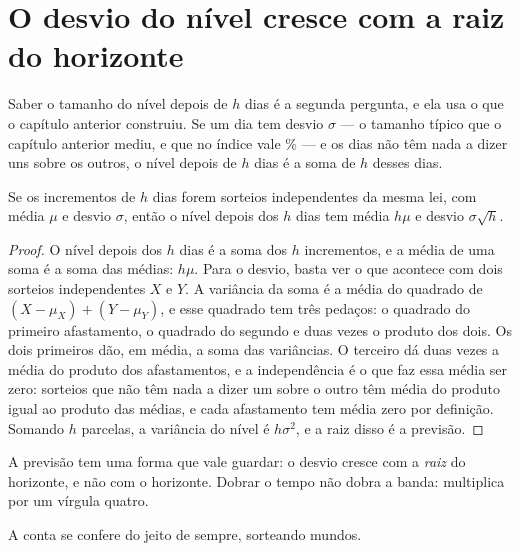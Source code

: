 \section{O desvio do nível cresce com a raiz do horizonte}

Saber o tamanho do nível depois de $h$ dias é a segunda pergunta, e ela usa o que o capítulo
anterior construiu.
Se um dia tem desvio $\sigma$ --- o tamanho típico que o capítulo anterior mediu, e que no índice vale \numSomaDesvioDiarioPct\% --- e os dias
não têm nada a dizer uns sobre os outros, o nível depois de $h$ dias é a soma de $h$ desses dias.

\begin{proposicao}\label{prop:passo}
Se os incrementos de $h$ dias forem sorteios independentes da mesma lei, com média $\mu$ e
desvio $\sigma$, então o nível depois dos $h$ dias tem média $h\mu$ e desvio
$\sigma\sqrt{h}$.
\end{proposicao}

\begin{proof}
O nível depois dos $h$ dias é a soma dos $h$ incrementos, e a média de uma soma é a soma das
médias: $h\mu$.
Para o desvio, basta ver o que acontece com dois sorteios independentes $X$ e
$Y$. A variância da soma é a média do quadrado de $(X-\mu_X)+(Y-\mu_Y)$, e esse quadrado tem
três pedaços: o quadrado do primeiro afastamento, o quadrado do segundo e duas vezes o produto
dos dois. Os dois primeiros dão, em média, a soma das variâncias. O terceiro dá duas vezes a
média do produto dos afastamentos, e a independência é o que faz essa média ser zero: sorteios
que não têm nada a dizer um sobre o outro têm média do produto igual ao produto das médias, e
cada afastamento tem média zero por definição. Somando $h$ parcelas, a variância do nível é
$h\sigma^{2}$, e a raiz disso é a previsão.
\end{proof}

A previsão tem uma forma que vale guardar: o desvio cresce com a \emph{raiz} do horizonte, e
não com o horizonte. Dobrar o tempo não dobra a banda: multiplica por um vírgula quatro.

A conta se confere do jeito de sempre, sorteando mundos.

